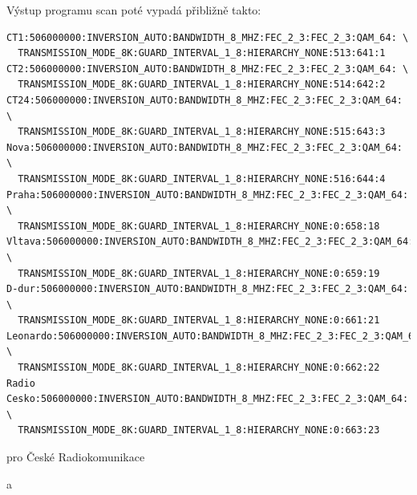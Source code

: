 \vspace{10pt}

Výstup programu scan poté vypadá přibližně takto:
 
\vspace{10pt}

\begin{small}
\begin{verbatim}
CT1:506000000:INVERSION_AUTO:BANDWIDTH_8_MHZ:FEC_2_3:FEC_2_3:QAM_64: \
  TRANSMISSION_MODE_8K:GUARD_INTERVAL_1_8:HIERARCHY_NONE:513:641:1
CT2:506000000:INVERSION_AUTO:BANDWIDTH_8_MHZ:FEC_2_3:FEC_2_3:QAM_64: \
  TRANSMISSION_MODE_8K:GUARD_INTERVAL_1_8:HIERARCHY_NONE:514:642:2
CT24:506000000:INVERSION_AUTO:BANDWIDTH_8_MHZ:FEC_2_3:FEC_2_3:QAM_64: \
  TRANSMISSION_MODE_8K:GUARD_INTERVAL_1_8:HIERARCHY_NONE:515:643:3
Nova:506000000:INVERSION_AUTO:BANDWIDTH_8_MHZ:FEC_2_3:FEC_2_3:QAM_64: \
  TRANSMISSION_MODE_8K:GUARD_INTERVAL_1_8:HIERARCHY_NONE:516:644:4
Praha:506000000:INVERSION_AUTO:BANDWIDTH_8_MHZ:FEC_2_3:FEC_2_3:QAM_64: \
  TRANSMISSION_MODE_8K:GUARD_INTERVAL_1_8:HIERARCHY_NONE:0:658:18
Vltava:506000000:INVERSION_AUTO:BANDWIDTH_8_MHZ:FEC_2_3:FEC_2_3:QAM_64: \
  TRANSMISSION_MODE_8K:GUARD_INTERVAL_1_8:HIERARCHY_NONE:0:659:19
D-dur:506000000:INVERSION_AUTO:BANDWIDTH_8_MHZ:FEC_2_3:FEC_2_3:QAM_64: \
  TRANSMISSION_MODE_8K:GUARD_INTERVAL_1_8:HIERARCHY_NONE:0:661:21
Leonardo:506000000:INVERSION_AUTO:BANDWIDTH_8_MHZ:FEC_2_3:FEC_2_3:QAM_64: \
  TRANSMISSION_MODE_8K:GUARD_INTERVAL_1_8:HIERARCHY_NONE:0:662:22
Radio Cesko:506000000:INVERSION_AUTO:BANDWIDTH_8_MHZ:FEC_2_3:FEC_2_3:QAM_64: \
  TRANSMISSION_MODE_8K:GUARD_INTERVAL_1_8:HIERARCHY_NONE:0:663:23
\end{verbatim}
\end{small}

\vspace{10pt}

pro České Radiokomunikace

\vspace{10pt}

a

\vspace{10pt}

